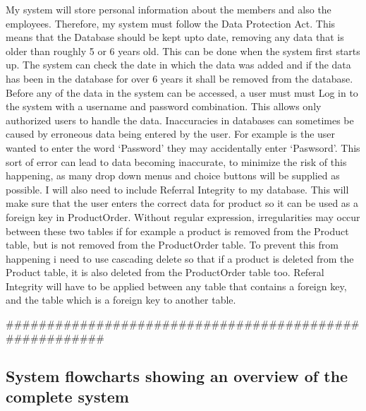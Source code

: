 My system will store personal information about the members and also the employees. Therefore, my system must follow the Data Protection Act. This means that the Database should be kept upto date, removing any data that is older than roughly 5 or 6 years old. This can be done when the system first starts up. The system can check the date in which the data was added and if the data has been in the database for over 6 years it shall be removed from the database. Before any of the data in the system can be accessed, a user must must Log in to the system with a username and password combination. This allows only authorized users to handle the data. Inaccuracies in databases can sometimes be caused by erroneous data being entered by the user. For example is the user wanted to enter the word `Password' they may accidentally enter `Paswsord'. This sort of error can lead to data becoming inaccurate, to minimize the risk of this happening, as many drop down menus and choice buttons will be supplied as possible. I will also need to include Referral Integrity to my database. This will make sure that the user enters the correct data for product so it can be used as a foreign key in ProductOrder. Without regular expression, irregularities may occur between these two tables if for example a product is removed from the Product table, but is not removed from the ProductOrder table. To prevent this from happening i need to use cascading delete so that if a product is deleted from the Product table, it is also deleted from the ProductOrder table too. Referal Integrity will have to be applied between any table that contains a foreign key, and the table which is a foreign key to another table.



#######################################################




\subsection{System flowcharts showing an overview of the complete system}

